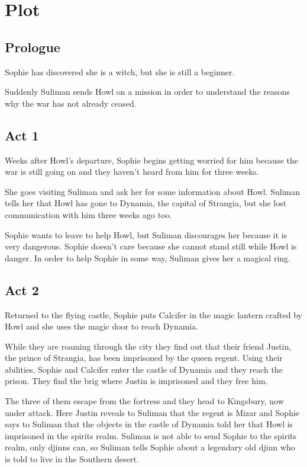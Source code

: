 \section{Plot}

\subsection*{Prologue}
Sophie has discovered she is a witch, but she is still a beginner.

Suddenly Suliman sends Howl on a mission in order to understand the reasons why the war has not already ceased.


\subsection*{Act 1}
Weeks after Howl's departure, Sophie begins getting worried for him because the war is still going on and they haven't heard from him for three weeks.

She goes visiting Suliman and ask her for some information about Howl. Suliman tells her that Howl has gone to Dynamia, the capital of Strangia, but she lost communication with him three weeks ago too.

Sophie wants to leave to help Howl, but Suliman discourages her because it is very dangerous. Sophie doesn't care because she cannot stand still while Howl is danger. In order to help Sophie in some way, Suliman gives her a magical ring.

\subsection*{Act 2}
Returned to the flying castle, Sophie puts Calcifer in the magic lantern crafted by Howl and she uses the magic door to reach Dynamia.

While they are roaming through the city they find out that their friend Justin, the prince of Strangia, has been imprisoned by the queen regent. Using their abilities, Sophie and Calcifer enter the castle of Dynamia and they reach the prison. They find the brig where Justin is imprisoned and they free him.

The three of them escape from the fortress and they head to Kingsbury, now under attack. Here Justin reveals to Suliman that the regent is Mizar and Sophie says to Suliman that the objects in the castle of Dynamia told her that Howl is imprisoned in the spirits realm. Suliman is not able to send Sophie to the spirits realm, only djinns can, so Suliman tells Sophie about a legendary old djinn who is told to live in the Southern desert.

